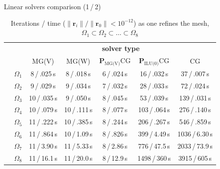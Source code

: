 \documentclass[svgnames]{beamer} %
\newcommand{\vect}[1]{\boldsymbol{\mathbf{#1}}}
\newcommand{\Pmgv}{\vect P_{\text{MG(V)}}}
\newcommand{\Pilu}{\vect P_{\text{ILU(0)}}}
\begin{document}
	\begin{frame}{Linear solvers comparison (1\,/\,2)}
		\begin{table}
			\centering
			\caption{
				Iterations / time ($\|\vect r_i\|/\|\vect r_0\| < 10^{-12}$) as one refines the mesh, $\Omega_1 \subset \Omega_2 \subset \dots \subset \Omega_8$
			} 
			\label{tab:divgrad_iters}
			\footnotesize
			\begin{tabular}[1.2]{ c c c | c | c | c | c | }
				& & \multicolumn{5}{c}{\textbf{solver type}} \\ 
				\cline{3-7}
				& & \multicolumn{1}{|c|}{MG(V)} & MG(W) & $\Pmgv$CG & $\Pilu$CG & CG \\
				\cline{2-7} 
				\multirow{8}{*}{\rotatebox[origin=c]{90}{\textbf{mesh level}}} 
				& \multicolumn{1}{|c|}{$\Omega_1$} & 8\,/\,.025\,s  & 8\,/\,.018\,s  & 6\,/\,.024\,s & 16\,/\,.032\,s & 37\,/\,.007\,s   \\
				\cline{2-7}
				& \multicolumn{1}{|c|}{$\Omega_2$} & 9\,/\,.029\,s  & 9\,/\,.034\,s  & 7\,/\,.032\,s & 28\,/\,.033\,s & 72\,/\,.024\,s   \\
				\cline{2-7}
				& \multicolumn{1}{|c|}{$\Omega_3$} & 10\,/\,.035\,s & 9\,/\,.050\,s  & 8\,/\,.045\,s & 53\,/\,.039\,s & 139\,/\,.031\,s  \\
				\cline{2-7}
				& \multicolumn{1}{|c|}{$\Omega_4$} & 10\,/\,.079\,s & 10\,/\,.111\,s & 8\,/\,.077\,s & 103\,/\,.064\,s & 276\,/\,.140\,s  \\
				\cline{2-7}
				& \multicolumn{1}{|c|}{$\Omega_5$} & 11\,/\,.222\,s & 10\,/\,.385\,s & 8\,/\,.244\,s & 206\,/\,.267\,s & 546\,/\,.859\,s  \\
				\cline{2-7}
				& \multicolumn{1}{|c|}{$\Omega_6$} & 11\,/\,.864\,s & 10\,/\,1.09\,s & 8\,/\,.826\,s & 399\,/\,4.49\,s & 1036\,/\,6.30\,s \\
				\cline{2-7}
				& \multicolumn{1}{|c|}{$\Omega_7$} & 11\,/\,3.90\,s & 11\,/\,5.33\,s & 8\,/\,2.86\,s & 776\,/\,47.5\,s & 2033\,/\,73.9\,s \\
				\cline{2-7}
				& \multicolumn{1}{|c|}{$\Omega_8$} & 11\,/\,16.1\,s & 11\,/\,20.0\,s & 8\,/\,12.9\,s & 1498\,/\,360\,s & 3915\,/\,605\,s \\
				\cline{2-7}
			\end{tabular}
		\end{table}
	\end{frame}
\end{document}
